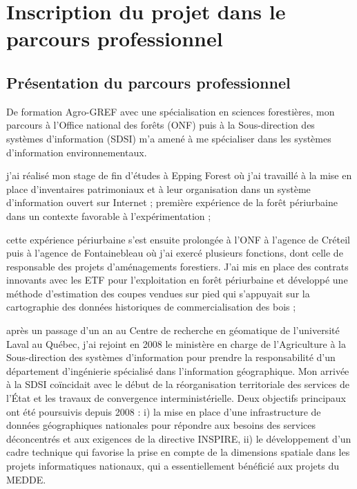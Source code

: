 \section
{Inscription du projet dans le parcours professionnel}

\subsection
{Présentation du parcours professionnel}

De formation Agro-GREF avec une spécialisation en sciences forestières,
mon parcours à l'Office national des forêts (ONF)
puis à la Sous-direction des systèmes d'information (SDSI)
m'a amené à me spécialiser
dans les systèmes d'information environnementaux.

\startitemize[n]

\item j'ai réalisé mon stage de fin d'études à Epping Forest
      où j'ai travaillé à la mise en place d'inventaires patrimoniaux
      et à leur organisation dans un système d'information
      ouvert sur Internet ; première expérience de la forêt
      périurbaine dans un contexte favorable à l'expérimentation ;

\item cette expérience périurbaine s'est ensuite prolongée à l'ONF
      à l'agence de Créteil puis à l'agence de Fontainebleau
      où j'ai exercé plusieurs fonctions, dont celle de responsable
      des projets d'aménagements forestiers. J'ai mis en place
      des contrats innovants avec les ETF pour l'exploitation
      en forêt périurbaine et développé une méthode d'estimation
      des coupes vendues sur pied qui s'appuyait sur la cartographie
      des données historiques de commercialisation des bois ;

\item après un passage d'un an au Centre de recherche en géomatique
      de l'université Laval au Québec, j'ai rejoint en 2008 le ministère
      en charge de l'Agriculture à la Sous-direction des systèmes 
      d'information pour prendre la responsabilité
      d'un département d'ingénierie spécialisé dans
      l'information géographique. Mon arrivée à la SDSI
      coïncidait avec le début de la réorganisation territoriale
      des services de l'État et les travaux de convergence
      interministérielle. Deux objectifs principaux ont été
      poursuivis depuis 2008 :
      i) la mise en place d'une infrastructure
      de données géographiques nationales pour répondre aux besoins
      des services déconcentrés et aux exigences
      de la directive INSPIRE,
      ii) le développement d'un cadre technique
      qui favorise la prise en compte de la dimensions spatiale
      dans les projets informatiques nationaux,
      qui a essentiellement bénéficié aux projets du MEDDE.

